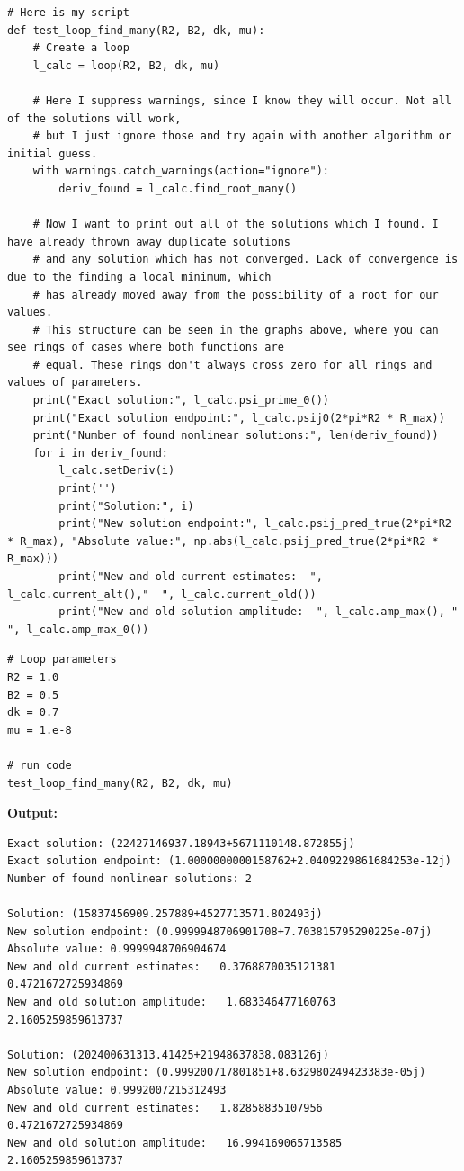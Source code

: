 \documentclass{article}
\begin{document}
\begin{lstlisting}
# Here is my script
def test_loop_find_many(R2, B2, dk, mu):
    # Create a loop
    l_calc = loop(R2, B2, dk, mu)

    # Here I suppress warnings, since I know they will occur. Not all of the solutions will work,
    # but I just ignore those and try again with another algorithm or initial guess.
    with warnings.catch_warnings(action="ignore"):
        deriv_found = l_calc.find_root_many()

    # Now I want to print out all of the solutions which I found. I have already thrown away duplicate solutions
    # and any solution which has not converged. Lack of convergence is due to the finding a local minimum, which 
    # has already moved away from the possibility of a root for our values.
    # This structure can be seen in the graphs above, where you can see rings of cases where both functions are 
    # equal. These rings don't always cross zero for all rings and values of parameters.
    print("Exact solution:", l_calc.psi_prime_0())
    print("Exact solution endpoint:", l_calc.psij0(2*pi*R2 * R_max))
    print("Number of found nonlinear solutions:", len(deriv_found))
    for i in deriv_found:
        l_calc.setDeriv(i)
        print('')
        print("Solution:", i)
        print("New solution endpoint:", l_calc.psij_pred_true(2*pi*R2 * R_max), "Absolute value:", np.abs(l_calc.psij_pred_true(2*pi*R2 * R_max)))
        print("New and old current estimates:  ", l_calc.current_alt(),"  ", l_calc.current_old())
        print("New and old solution amplitude:  ", l_calc.amp_max(), "  ", l_calc.amp_max_0())\end{lstlisting}

\begin{lstlisting}
# Loop parameters
R2 = 1.0
B2 = 0.5
dk = 0.7
mu = 1.e-8

# run code
test_loop_find_many(R2, B2, dk, mu)\end{lstlisting}

\textbf{Output:}\begin{verbatim}
Exact solution: (22427146937.18943+5671110148.872855j)
Exact solution endpoint: (1.0000000000158762+2.0409229861684253e-12j)
Number of found nonlinear solutions: 2

Solution: (15837456909.257889+4527713571.802493j)
New solution endpoint: (0.9999948706901708+7.703815795290225e-07j) Absolute value: 0.9999948706904674
New and old current estimates:   0.3768870035121381    0.4721672725934869
New and old solution amplitude:   1.683346477160763    2.1605259859613737

Solution: (202400631313.41425+21948637838.083126j)
New solution endpoint: (0.999200717801851+8.632980249423383e-05j) Absolute value: 0.9992007215312493
New and old current estimates:   1.82858835107956    0.4721672725934869
New and old solution amplitude:   16.994169065713585    2.1605259859613737

\end{verbatim}
\end{document}
